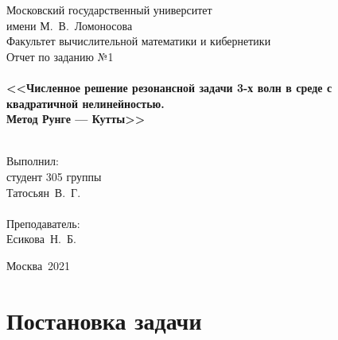 \documentclass[a4paper,12pt,titlepage,finall]{article}
\begin{document}
\begin{titlepage}
    \begin{center}
	{\small \sc Московский государственный университет \\имени М.~В.~Ломоносова\\
	Факультет вычислительной математики и кибернетики\\}
	\vfill
	{\Large \sc Отчет по заданию №1}\\
	~\\
	{\large \bf <<Численное решение резонансной задачи 3-х волн в среде с квадратичной нелинейностью.\\
	    Метод Рунге — Кутты>>}\\ 
	~\\
    \end{center}
    \begin{flushright}
	\vfill {Выполнил:\\
	студент 305 группы\\
	Татосьян~В.~Г.\\
	~\\
	Преподаватель:\\
	Есикова~Н.~Б.}
    \end{flushright}
    \begin{center}
	\vfill
	{\small Москва\ 2021}
    \end{center}
\end{titlepage}

\tableofcontents
\newpage

\section{Постановка задачи}
\end{document}
